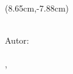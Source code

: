 \begin{titlepage}
\vfill

\begin{textblock*}{7.35cm}(8.65cm,-7.88cm)%
\begin{flushleft}
 {\ArialBoldItalicMT\fontsize{12pt}{14pt}
 {\addfontfeature{}
 {\MakeUppercase\tipotrabajo}}}\\[0.49cm]
 {\ArialMT\fontsize{12pt}{14pt}
 {\addfontfeature{}
 Autor:}}\\ 
 {\ArialBoldMT\fontsize{12pt}{14pt}
 {\addfontfeature{}
 {\miNombre}}}\\[0.5cm]
 {\ArialBoldItalicMT\fontsize{12pt}{14pt}
 {\addfontfeature{}
 {\MakeUppercase \miUbicacion, \number\year}}}
\end{flushleft}
\end{textblock*}



\end{titlepage} %

\restoregeometry


